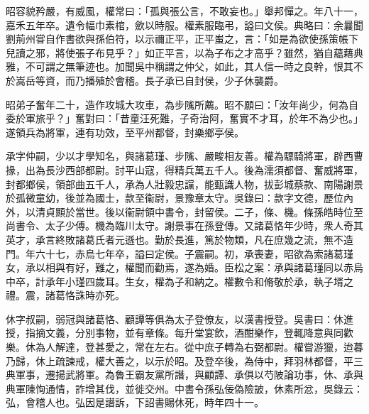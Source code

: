 \begin{pinyinscope}
昭容貌矜嚴，有威風，權常曰：「孤與張公言，不敢妄也。」舉邦憚之。年八十一，嘉禾五年卒。遺令幅巾素棺，歛以時服。權素服臨弔，謚曰文侯。典略曰：余曩聞劉荊州甞自作書欲與孫伯符，以示禰正平，正平蚩之，言：「如是為欲使孫策帳下兒讀之邪，將使張子布見乎？」如正平言，以為子布之才高乎？雖然，猶自蘊藉典雅，不可謂之無筆迹也。加聞吳中稱謂之仲父，如此，其人信一時之良幹，恨其不於嵩岳等資，而乃播殖於會稽。長子承已自封侯，少子休襲爵。

昭弟子奮年二十，造作攻城大攻車，為步隲所薦。昭不願曰：「汝年尚少，何為自委於軍旅乎？」奮對曰：「昔童汪死難，子奇治阿，奮實不才耳，於年不為少也。」遂領兵為將軍，連有功效，至平州都督，封樂鄉亭侯。

承字仲嗣，少以才學知名，與諸葛瑾、步隲、嚴畯相友善。權為驃騎將軍，辟西曹掾，出為長沙西部都尉。討平山寇，得精兵萬五千人。後為濡須都督、奮威將軍，封都鄉侯，領部曲五千人，承為人壯毅忠讜，能甄識人物，拔彭城蔡款、南陽謝景於孤微童幼，後並為國士，款至衞尉，景豫章太守。吳錄曰：款字文德，歷位內外，以清貞顯於當世。後以衞尉領中書令，封留侯。二子，條、機。條孫皓時位至尚書令、太子少傅。機為臨川太守。謝景事在孫登傳。又諸葛恪年少時，衆人奇其英才，承言終敗諸葛氏者元遜也。勤於長進，篤於物類，凡在庶幾之流，無不造門。年六十七，赤烏七年卒，謚曰定侯。子震嗣。初，承喪妻，昭欲為索諸葛瑾女，承以相與有好，難之，權聞而勸焉，遂為婚。臣松之案：承與諸葛瑾同以赤烏中卒，計承年小瑾四歲耳。生女，權為子和納之。權數令和脩敬於承，執子壻之禮。震，諸葛恪誅時亦死。

休字叔嗣，弱冠與諸葛恪、顧譚等俱為太子登僚友，以漢書授登。吳書曰：休進授，指摘文義，分別事物，並有章條。每升堂宴飲，酒酣樂作，登輒降意與同歡樂。休為人解達，登甚愛之，常在左右。從中庶子轉為右弼都尉。權嘗游獵，迨暮乃歸，休上疏諫戒，權大善之，以示於昭。及登卒後，為侍中，拜羽林都督，平三典軍事，遷揚武將軍。為魯王霸友黨所譖，與顧譚、承俱以芍陂論功事，休、承與典軍陳恂通情，詐增其伐，並徙交州。中書令孫弘佞偽險詖，休素所忿，吳錄云：弘，會稽人也。弘因是譖訴，下詔書賜休死，時年四十一。


\end{pinyinscope}